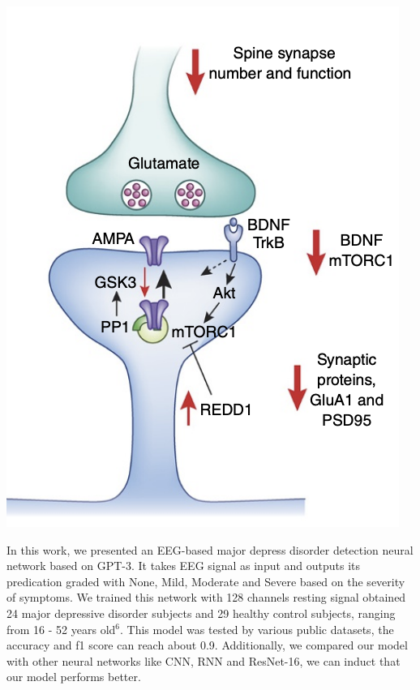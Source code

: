 \documentclass[a0,portrait]{a0poster}
\begin{document}
\begin{minipage}[c]{\linewidth}
\begin{framed}
\begin{multicols}{2}
\begin{center}
\includegraphics[trim={0 0.9cm 0 0},clip,width=0.49\linewidth]{figures/abnormal}
\label{IGSMap}
\end{center}
In this work, we presented an EEG-based major depress disorder detection neural network based on GPT-3. It takes EEG signal as input and outputs its predication graded with None, Mild, Moderate and Severe based on the severity of symptoms. We trained this network with 128 channels resting signal obtained 24 major depressive disorder subjects and 29 healthy control subjects, ranging from 16 - 52 years old$^6$. This model was tested by various public datasets, the accuracy and f1 score can reach about 0.9. Additionally, we compared our model with other neural networks like CNN, RNN and ResNet-16, we can induct that our model performs better.
\color{Black}

\end{multicols}
\end{framed}
\end{minipage}
\end{document}
